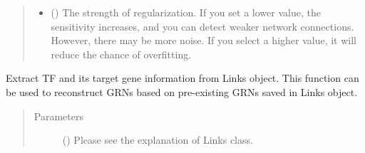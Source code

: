 \documentclass[letterpaper,10pt,english]{sphinxmanual}
\begin{document}
\begin{fulllineitems}
\begin{fulllineitems}
\begin{quote}
\begin{description}
\begin{itemize}
\item {} 
 () \textendash{} The strength of regularization.
If you set a lower value, the sensitivity increases, and you can detect weaker network connections. However, there may be more noise.
If you select a higher value, it will reduce the chance of overfitting.

\end{itemize}

\end{description}\end{quote}

\end{fulllineitems}


\begin{fulllineitems}
\label{\detokenize{modules/celloracle:celloracle.Oracle.get_cluster_specific_TFdict_from_Links}}
Extract TF and its target gene information from Links object.
This function can be used to reconstruct GRNs based on pre-existing GRNs saved in Links object.
\begin{quote}\begin{description}
\item[{Parameters}] \leavevmode
{} ({\hyperref[\detokenize{modules/celloracle:celloracle.Links}]{}}) \textendash{} Please see the explanation of Links class.

\end{description}\end{quote}

\end{fulllineitems}



\end{fulllineitems}
\end{document}
